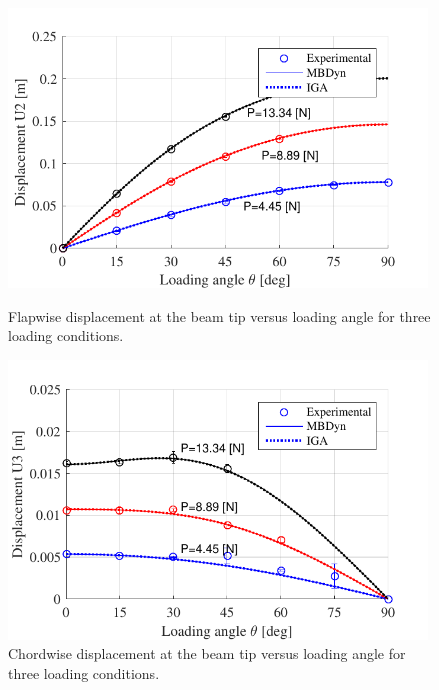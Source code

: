 \documentclass[review]{elsarticle}
\begin{document}
\begin{figure}[ht]
 \begin{minipage}[b]{0.48\linewidth}
    \centering
    \includegraphics[width=0.99\textwidth]{benchmark_princeton/benchmark_princeton_u2.pdf}
    \caption{Flapwise displacement at the beam tip versus loading angle for three loading conditions.}
    \label{figB1u2}
 \end{minipage}
 \hspace{0.4cm}
 \begin{minipage}[b]{0.48\linewidth}
    \centering
    \includegraphics[width=0.99\textwidth]{benchmark_princeton/benchmark_princeton_u3.pdf}
    \caption{Chordwise displacement at the beam tip versus loading angle for three loading conditions.}
    \label{figB1u3}
 \end{minipage}
\end{figure}
\end{document}
